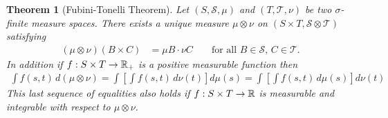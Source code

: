 \documentclass{amsart}
\newtheorem{thm}{Theorem}[section]
\theoremstyle{remark}
\theoremstyle{definition}
\begin{document}
\begin{thm}[Fubini-Tonelli Theorem]\label{Fubini}Let $(S, \mathcal{S}, \mu)$
  and $(T, \mathcal{T}, \nu)$ be two $\sigma$-finite measure spaces.
  There exists a unique measure $\mu \otimes \nu$ on $(S \times T,
  \mathcal{S} \otimes \mathcal{T})$ satisfying 
\begin{align*}
(\mu \otimes \nu)(B \times C) &= \mu B \cdot \nu C & &\text{ for all
  $B \in \mathcal{S}$, $C \in \mathcal{T}$.}
\end{align*}
In addition if $f : S \times T \to \mathbb{R}_+$ is a positive measurable
function then 
\begin{align*}
\int f(s,t) \,  d (\mu \otimes \nu) = \int \left [ \int f(s,t) \, d
\nu(t) \right ] d \mu(s)  = \int \left [ \int f(s,t) \, d \mu(s)
\right ] d\nu(t)
\end{align*}
This last sequence of equalities also holds if $f : S \times T \to \mathbb{R}$
is measurable and integrable with respect to $\mu \otimes \nu$.
\end{thm}
\end{document}
